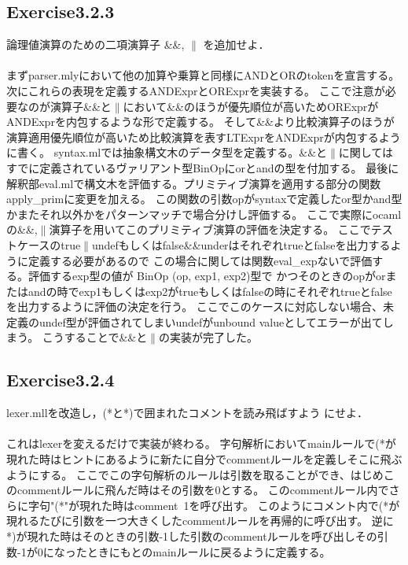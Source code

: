 \documentclass[a4paper,11pt,oneside,openany]{jsarticle}
\begin{document}
\subsection{Exercise3.2.3}
    論理値演算のための二項演算子 \&\&, $\parallel$ を追加せよ． \\\\
    まずparser.mlyにおいて他の加算や乗算と同様にANDとORのtokenを宣言する。次にこれらの表現を定義するANDExprとORExprを実装する。
    ここで注意が必要なのが演算子\&\&と$\parallel$において\&\&のほうが優先順位が高いためORExprがANDExprを内包するような形で定義する。
    そして\&\&より比較演算子のほうが演算適用優先順位が高いため比較演算を表すLTExprをANDExprが内包するように書く。
    syntax.mlでは抽象構文木のデータ型を定義する。\&\&と$\parallel$に関してはすでに定義されているヴァリアント型BinOpにorとandの型を付加する。
    最後に解釈部eval.mlで構文木を評価する。プリミティブ演算を適用する部分の関数apply\_primに変更を加える。
    この関数の引数opがsyntaxで定義したor型かand型かまたそれ以外かをパターンマッチで場合分けし評価する。
    ここで実際にocamlの\&\&,$\parallel$演算子を用いてこのプリミティブ演算の評価を決定する。
    ここでテストケースのtrue$\parallel$undefもしくはfalse\&\&underはそれぞれtrueとfalseを出力するように定義する必要があるので
    この場合に関しては関数eval\_expないで評価する。評価するexp型の値が BinOp (op, exp1, exp2)型で
    かつそのときのopがorまたはandの時でexp1もしくはexp2がtrueもしくはfalseの時にそれぞれtrueとfalseを出力するように評価の決定を行う。
    ここでこのケースに対応しない場合、未定義のundef型が評価されてしまいundefがunbound valueとしてエラーが出てしまう。
    こうすることで\&\&と$\parallel$の実装が完了した。

\subsection{Exercise3.2.4}
    lexer.mllを改造し，(*と*)で囲まれたコメントを読み飛ばすよう にせよ．\\\\
    これはlexerを変えるだけで実装が終わる。
    字句解析においてmainルールで(*が現れた時はヒントにあるように新たに自分でcommentルールを定義しそこに飛ぶようにする。
    ここでこの字句解析のルールは引数を取ることができ、はじめこのcommentルールに飛んだ時はその引数を0とする。
    このcommentルール内でさらに字句"(*"が現れた時はcomment\ 1を呼び出す。
    このようにコメント内で(*が現れるたびに引数を一つ大きくしたcommentルールを再帰的に呼び出す。
    逆に*)が現れた時はそのときの引数-1した引数のcommentルールを呼び出しその引数-1が0になったときにもとのmainルールに戻るように定義する。
\end{document}
